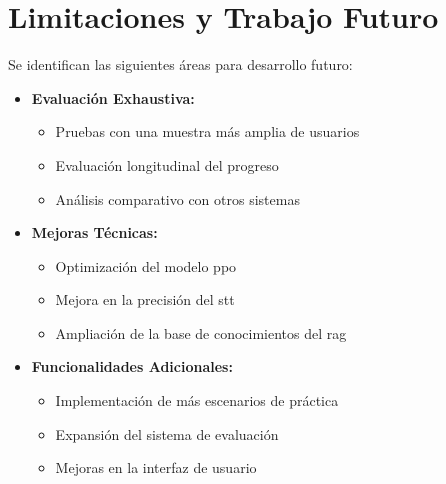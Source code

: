 \section{Limitaciones y Trabajo Futuro}
\label{limitaciones-trabajo-futuro}

Se identifican las siguientes áreas para desarrollo futuro:

\begin{itemize}
    \item \textbf{Evaluación Exhaustiva:}
    \begin{itemize}
        \item Pruebas con una muestra más amplia de usuarios
        \item Evaluación longitudinal del progreso
        \item Análisis comparativo con otros sistemas
    \end{itemize}

    \item \textbf{Mejoras Técnicas:}
    \begin{itemize}
        \item Optimización del modelo \gls{ppo}
        \item Mejora en la precisión del \gls{stt}
        \item Ampliación de la base de conocimientos del \gls{rag}
    \end{itemize}

    \item \textbf{Funcionalidades Adicionales:}
    \begin{itemize}
        \item Implementación de más escenarios de práctica
        \item Expansión del sistema de evaluación
        \item Mejoras en la interfaz de usuario
    \end{itemize}
\end{itemize}